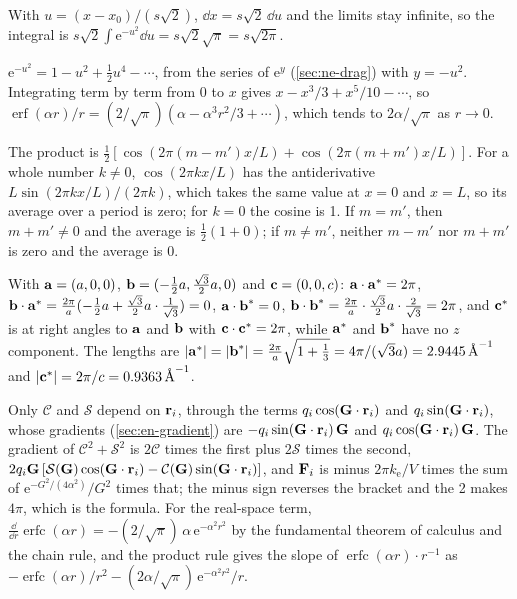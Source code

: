 With $u = (x - x_0)/(s\sqrt2)$, $\dd x =
s\sqrt2\,\dd u$ and the limits stay infinite, so the integral is
$s\sqrt2\int\mathrm{e}^{-u^2}\dd u = s\sqrt2\sqrt\pi = s\sqrt{2\pi}$.

$\mathrm{e}^{-u^2} = 1 - u^2 + \frac12u^4 - \dotsb$,
from the series of $\mathrm{e}^y$ (\cref{sec:ne-drag}) with $y = -u^2$. Integrating term by
term from 0 to $x$ gives $x - x^3/3 + x^5/10 - \dotsb$, so
$\operatorname{erf}(\alpha r)/r = (2/\sqrt\pi)(\alpha - \alpha^3r^2/3 +
\dotsb)$, which tends to $2\alpha/\sqrt\pi$ as $r \to 0$.

The product is $\frac12[\cos(2\pi(m -
m')x/L) + \cos(2\pi(m + m')x/L)]$. For a whole number $k \neq 0$,
$\cos(2\pi kx/L)$ has the antiderivative $L\sin(2\pi kx/L)/(2\pi k)$,
which takes the same value at $x = 0$ and $x = L$, so its average over a
period is zero; for $k = 0$ the cosine is 1. If $m = m'$, then $m + m'
\neq 0$ and the average is $\frac12(1 + 0)$; if $m \neq m'$, neither $m -
m'$ nor $m + m'$ is zero and the average is 0.

With $\bm{\mathrm{a}} = (a, 0, 0)$, $\bm{\mathrm{b}} =
(-\frac12a, \frac{\sqrt3}2a, 0)$ and $\bm{\mathrm{c}} = (0, 0, c)$: $\bm{\mathrm{a}}\cdot
\bm{\mathrm{a}}^* = 2\pi$, $\bm{\mathrm{b}}\cdot\bm{\mathrm{a}}^* = \frac{2\pi}{a}(-\frac12a +
\frac{\sqrt3}2a\cdot\frac1{\sqrt3}) = 0$, $\bm{\mathrm{a}}\cdot\bm{\mathrm{b}}^* = 0$,
$\bm{\mathrm{b}}\cdot\bm{\mathrm{b}}^* = \frac{2\pi}{a}\cdot\frac{\sqrt3}2a\cdot
\frac2{\sqrt3} = 2\pi$, and $\bm{\mathrm{c}}^*$ is at right angles to $\bm{\mathrm{a}}$
and $\bm{\mathrm{b}}$ with $\bm{\mathrm{c}}\cdot\bm{\mathrm{c}}^* = 2\pi$, while $\bm{\mathrm{a}}^*$ and
$\bm{\mathrm{b}}^*$ have no $z$ component. The lengths are $\lvert\bm{\mathrm{a}}^*\rvert =
\lvert\bm{\mathrm{b}}^*\rvert = \frac{2\pi}{a}\sqrt{1 + \frac13} = 4\pi/(\sqrt3a) =
\SI{2.9445}{\per\angstrom}$ and $\lvert\bm{\mathrm{c}}^*\rvert = 2\pi/c =
\SI{0.9363}{\per\angstrom}$.

Only $\mathcal{C}$ and $\mathcal{S}$ depend on $\bm{\mathrm{r}}_i$, through
the terms $q_i\cos(\bm{\mathrm{G}}\cdot\bm{\mathrm{r}}_i)$ and $q_i\sin(\bm{\mathrm{G}}\cdot
\bm{\mathrm{r}}_i)$, whose gradients (\cref{sec:en-gradient}) are $-q_i\sin(\bm{\mathrm{G}}
\cdot\bm{\mathrm{r}}_i)\,\bm{\mathrm{G}}$ and $q_i\cos(\bm{\mathrm{G}}\cdot\bm{\mathrm{r}}_i)\,\bm{\mathrm{G}}$. The
gradient of $\mathcal{C}^2 + \mathcal{S}^2$ is $2\mathcal{C}$ times the first plus
$2\mathcal{S}$ times the
second, $2q_i\bm{\mathrm{G}}\,[\mathcal{S}(\bm{\mathrm{G}})\cos(\bm{\mathrm{G}}\cdot\bm{\mathrm{r}}_i) -
\mathcal{C}(\bm{\mathrm{G}})\sin(\bm{\mathrm{G}}\cdot\bm{\mathrm{r}}_i)]$, and $\bm{\mathrm{F}}_i$ is minus
$2\pi k_{\mathrm e}/V$ times the sum of $\mathrm{e}^{-G^2/(4\alpha^2)}/G^2$
times that; the minus sign reverses the bracket and the 2 makes $4\pi$,
which is the formula. For
the real-space term, $\frac{\dd}{\dd r}\operatorname{erfc}(\alpha r) =
-(2/\sqrt\pi)\,\alpha\,\mathrm{e}^{-\alpha^2r^2}$ by the fundamental theorem
of calculus and the chain rule, and the product rule gives the slope of
$\operatorname{erfc}(\alpha r)\cdot r^{-1}$ as $-\operatorname{erfc}(\alpha
r)/r^2 - (2\alpha/\sqrt\pi)\,\mathrm{e}^{-\alpha^2r^2}/r$.

